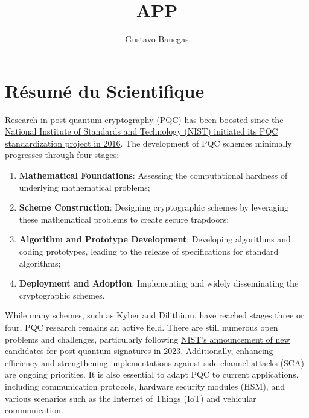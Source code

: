 \documentclass[11pt, a4paper]{article}
\begin{document}
\title{APP}
\author{Gustavo Banegas}
\date{}
\maketitle

\section{Résumé du Scientifique}


Research in post-quantum cryptography (PQC) has been boosted since 
\href{https://csrc.nist.gov/projects/post-quantum-cryptography/post-quantum-cryptography-standardization/call-for-proposals}
{the National Institute of Standards and Technology (NIST) initiated its PQC standardization project in 2016}. 
The development of PQC schemes minimally progresses through four stages:
\begin{enumerate}
\setlength{\itemsep}{0.1pt}
\item \textbf{Mathematical Foundations}: Assessing the computational hardness of underlying mathematical problems;
\item \textbf{Scheme Construction}: Designing cryptographic schemes by leveraging these mathematical problems to create secure trapdoors;
\item \textbf{Algorithm and Prototype Development}: Developing algorithms and coding prototypes, leading to the release of specifications for standard algorithms;
\item \textbf{Deployment and Adoption}: Implementing and widely disseminating the cryptographic schemes.
\end{enumerate}
While many schemes, such as Kyber and Dilithium, have reached stages three or four, 
PQC research remains an active field. There are still numerous open problems and challenges, 
particularly following \href{https://www.nist.gov/news-events/news/2023/07/nist-announces-additional-digital-signature-candidates-pqc-standardization}
{NIST's announcement of new candidates for post-quantum signatures in 2023}. 
Additionally, enhancing efficiency and strengthening implementations against side-channel attacks (SCA) 
are ongoing priorities. It is also essential to adapt PQC to current applications, including communication protocols, 
hardware security modules (HSM), and various scenarios such as the Internet of 
Things (IoT) and vehicular communication.
\end{document}
